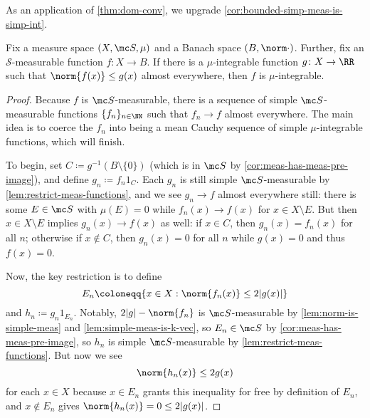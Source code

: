 \documentclass[../notes.tex]{subfiles}
\begin{document}
As an application of \autoref{thm:dom-conv}, we upgrade \autoref{cor:bounded-simp-meas-is-simp-int}.
\begin{corollary} \label{cor:bounded-meas-is-int}
	Fix a measure space $(X,\mc S,\mu)$ and a Banach space $(B,\norm\cdot)$. Further, fix an $\mathcal S$-measurable function $f\colon X\to B$. If there is a $\mu$-integrable function $g\colon X\to\RR$ such that $\norm{f(x)}\le g(x)$ almost everywhere, then $f$ is $\mu$-integrable.
\end{corollary}
\begin{proof}
	Because $f$ is $\mc S$-measurable, there is a sequence of simple $\mc S$-measurable functions $\{f_n\}_{n\in\NN}$ such that $f_n\to f$ almost everywhere. The main idea is to coerce the $f_n$ into being a mean Cauchy sequence of simple $\mu$-integrable functions, which will finish.
	
	To begin, set $C\coloneqq g^{-1}(B\setminus\{0\})$ (which is in $\mc S$ by \autoref{cor:meas-has-meas-pre-image}), and define $g_n\coloneqq f_n1_C$. Each $g_n$ is still simple $\mc S$-measurable by \autoref{lem:restrict-meas-functions}, and we see $g_n\to f$ almost everywhere still: there is some $E\in\mc S$ with $\mu(E)=0$ while $f_n(x)\to f(x)$ for $x\in X\setminus E$. But then $x\in X\setminus E$ implies $g_n(x)\to f(x)$ as well: if $x\in C$, then $g_n(x)=f_n(x)$ for all $n$; otherwise if $x\notin C$, then $g_n(x)=0$ for all $n$ while $g(x)=0$ and thus $f(x)=0$.
	
	Now, the key restriction is to define
	\[E_n\coloneqq\{x\in X:\norm{f_n(x)}\le2|g(x)|\}\]
	and $h_n\coloneqq g_n1_{E_n}$. Notably, $2|g|-\norm{f_n}$ is $\mc S$-measurable by \autoref{lem:norm-is-simple-meas} and \autoref{lem:simple-meas-is-k-vec}, so $E_n\in\mc S$ by \autoref{cor:meas-has-meas-pre-image}, so $h_n$ is simple $\mc S$-measurable by \autoref{lem:restrict-meas-functions}. But now we see
	\[\norm{h_n(x)}\le2g(x)\]
	for each $x\in X$ because $x\in E_n$ grants this inequality for free by definition of $E_n$, and $x\notin E_n$ gives $\norm{h_n(x)}=0\le2|g(x)|$.
	

\end{proof}
\end{document}
